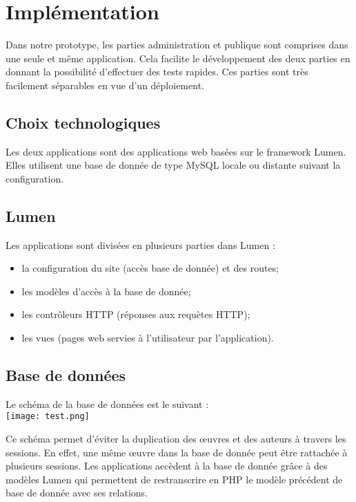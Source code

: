 \documentclass[a4paper]{article}
\begin{document}
\section{Implémentation}
Dans notre prototype, les parties administration et publique sont comprises dans une seule et même application. Cela facilite le développement des deux parties en donnant la possibilité d'effectuer des tests rapides. Ces parties sont très facilement séparables en vue d'un déploiement.
\subsection{Choix technologiques}
Les deux applications sont des applications web basées sur le framework Lumen. Elles utilisent une base de donnée de type MySQL locale ou distante suivant la configuration.
\subsection{Lumen}
Les applications sont divisées en plusieurs parties dans Lumen :
\begin{itemize}
\item la configuration du site (accès base de donnée) et des routes;
\item les modèles d'accès à la base de donnée;
\item les contrôleurs HTTP (réponses aux requètes HTTP);
\item les vues (pages web servies à l'utilisateur par l'application).
\end{itemize}

\subsection{Base de données}
Le schéma de la base de données est le suivant :\\
\newline
\texttt{[image: test.png]}

Ce schéma permet d'éviter la duplication des œuvres et des auteurs à travers les sessions. En effet, une même œuvre dans la base de donnée peut être rattachée à plusieurs sessions. Les applications accèdent à la base de donnée grâce à des modèles Lumen qui permettent de restranscrire en PHP le modèle précédent de base de donnée avec ses relations.
\end{document}
